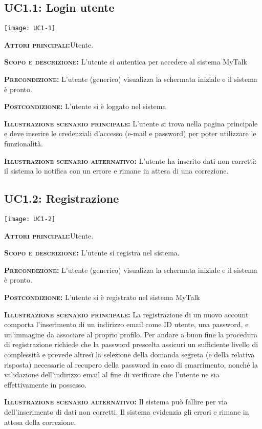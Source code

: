 \subsection{UC1.1: Login utente}
\begin{center}
\texttt{[image: UC1-1]}
\end{center}
\begin{description}
\item{\scshape\bfseries Attori principali:}Utente.
\item{\scshape\bfseries Scopo e descrizione:} L'utente si autentica per accedere al sistema MyTalk
\item{\scshape\bfseries Precondizione:} L'utente (generico) visualizza la schermata iniziale e il sistema è pronto.
\item{\scshape\bfseries Postcondizione:} L'utente si è loggato nel sistema
\item{\scshape\bfseries Illustrazione scenario principale:} L'utente si trova nella pagina principale e deve inserire le credenziali d'accesso (e-mail e password) per poter utilizzare le funzionalità.
\item{\scshape\bfseries Illustrazione scenario alternativo:} L'utente ha inserito dati non corretti: il sistema lo notifica con un errore e rimane in attesa di una correzione.
\end{description}

\subsection{UC1.2: Registrazione}
\begin{center}
\texttt{[image: UC1-2]}
\end{center}
\begin{description}
\item{\scshape\bfseries Attori principali:}Utente.
\item{\scshape\bfseries Scopo e descrizione:} L'utente si registra nel sistema.
\item{\scshape\bfseries Precondizione:} L'utente (generico) visualizza la schermata iniziale e il sistema è pronto.
\item{\scshape\bfseries Postcondizione:} L'utente si è registrato nel sistema MyTalk
\item{\scshape\bfseries Illustrazione scenario principale:} La registrazione di un nuovo account comporta l'inserimento di un indirizzo email come ID utente, una password, e un'immagine da associare al proprio profilo. Per andare a buon fine la procedura di registrazione richiede che la password prescelta assicuri un sufficiente livello di complessità e prevede altresì la selezione della domanda segreta (e della relativa risposta) necessarie al recupero della password in caso di smarrimento, nonché la validazione dell'indirizzo email al fine di verificare che l'utente ne sia effettivamente in possesso.
\item{\scshape\bfseries Illustrazione scenario alternativo:} Il sistema può fallire per via dell'inserimento di dati non corretti. Il sistema evidenzia gli errori e rimane in attesa della correzione.
\end{description}

